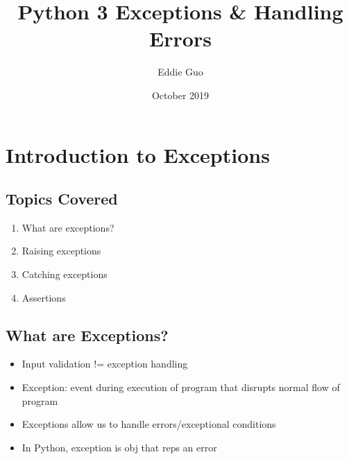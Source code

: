 \documentclass{article}
\title{Python 3 Exceptions \& Handling Errors}
\author{Eddie Guo}
\date{October 2019}
\begin{document}
\lstset{language=Python}
\maketitle

\section{Introduction to Exceptions}
\subsection{Topics Covered}
    \begin{multicols}{2}
        \begin{enumerate}[label=(\roman*)]
            \item What are exceptions?
            \item Raising exceptions
            \item Catching exceptions
            \item Assertions
        \end{enumerate}
    \end{multicols}

\subsection{What are Exceptions?}
    \begin{multicols}{2}
        \begin{itemize}
            \item Input validation != exception handling
            \item Exception: event during execution of program that disrupts normal flow of program
            \item Exceptions allow us to handle errors/exceptional conditions
            \item In Python, exception is obj that reps an error
        \end{itemize}
    \end{multicols}

\end{document}
